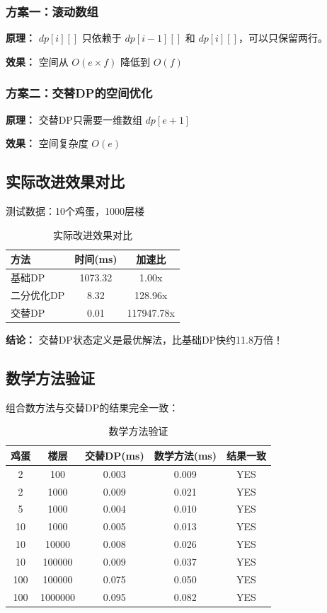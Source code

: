 \documentclass[12pt,a4paper]{article}
\begin{document}
\subsubsection{方案一：滚动数组}

\textbf{原理：} $dp[i][]$ 只依赖于 $dp[i-1][]$ 和 $dp[i][]$，可以只保留两行。

\textbf{效果：} 空间从 $O(e \times f)$ 降低到 $O(f)$

\subsubsection{方案二：交替DP的空间优化}

\textbf{原理：} 交替DP只需要一维数组 $dp[e+1]$

\textbf{效果：} 空间复杂度 $O(e)$

\subsection{实际改进效果对比}

测试数据：10个鸡蛋，1000层楼

\begin{table}[H]
\centering
\caption{实际改进效果对比}
\label{tab:improvement}
\begin{tabular}{@{}lcc@{}}
\toprule
\textbf{方法} & \textbf{时间(ms)} & \textbf{加速比} \\
\midrule
基础DP & 1073.32 & 1.00x \\
二分优化DP & 8.32 & 128.96x \\
交替DP & 0.01 & 117947.78x \\
\bottomrule
\end{tabular}
\end{table}

\textbf{结论：} 交替DP状态定义是最优解法，比基础DP快约11.8万倍！

\subsection{数学方法验证}

组合数方法与交替DP的结果完全一致：

\begin{table}[H]
\centering
\caption{数学方法验证}
\label{tab:math_verify}
\begin{tabular}{@{}ccccc@{}}
\toprule
\textbf{鸡蛋} & \textbf{楼层} & \textbf{交替DP(ms)} & \textbf{数学方法(ms)} & \textbf{结果一致} \\
\midrule
2 & 100 & 0.003 & 0.009 & YES \\
2 & 1000 & 0.009 & 0.021 & YES \\
5 & 1000 & 0.004 & 0.010 & YES \\
10 & 1000 & 0.005 & 0.013 & YES \\
10 & 10000 & 0.008 & 0.026 & YES \\
10 & 100000 & 0.009 & 0.037 & YES \\
100 & 100000 & 0.075 & 0.050 & YES \\
100 & 1000000 & 0.095 & 0.082 & YES \\
\bottomrule
\end{tabular}
\end{table}
\end{document}
